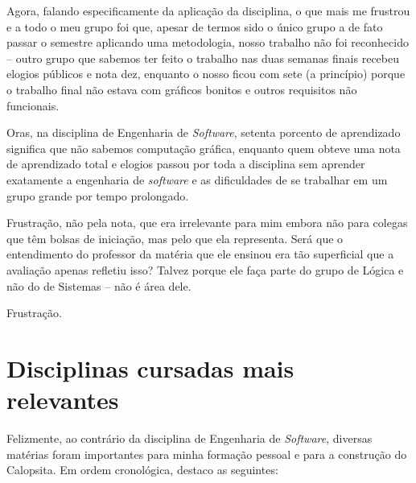 \documentclass[titlepage,a4paper]{article}
\newcommand{\software}{\textit{software}}
\newcommand{\calopsita}{Calopsita}
\begin{document}
Agora, falando especificamente da aplicação da disciplina, o que mais me frustrou e a todo o meu grupo foi que, apesar de termos sido o único grupo a de fato passar o semestre aplicando uma metodologia, nosso trabalho não foi reconhecido -- outro grupo que sabemos ter feito o trabalho nas duas semanas finais recebeu elogios públicos e nota dez, enquanto o nosso ficou com sete (a princípio) porque o trabalho final não estava com gráficos bonitos e outros requisitos não funcionais.

Oras, na disciplina de Engenharia de \textit{Software}, setenta porcento de aprendizado significa que não sabemos computação gráfica, enquanto quem obteve uma nota de aprendizado total e elogios passou por toda a disciplina sem aprender exatamente a engenharia de \software{} e as dificuldades de se trabalhar em um grupo grande por tempo prolongado.

Frustração, não pela nota, que era irrelevante para mim embora não para colegas que têm bolsas de iniciação, mas pelo que ela representa. Será que o entendimento do professor da matéria que ele ensinou era tão superficial que a avaliação apenas refletiu isso? Talvez porque ele faça parte do grupo de Lógica e não do de Sistemas -- não é área dele.

Frustração.

\section{Disciplinas cursadas mais relevantes}

Felizmente, ao contrário da disciplina de Engenharia de \textit{Software}, diversas matérias foram importantes para minha formação pessoal e para a construção do \calopsita{}. Em ordem cronológica, destaco as seguintes:
\end{document}
